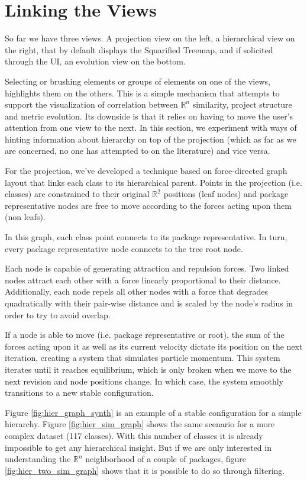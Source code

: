 \section{Linking the Views} \label{sec:linking}
So far we have three views. A projection view on the left, a hierarchical view on the right, that by default displays the Squarified Treemap, and if solicited through the UI, an evolution view on the bottom.

Selecting or brushing elements or groups of elements on one of the views, highlights them on the others. This is a simple mechanism that attempts to support the visualization of correlation between $\mathbb{R}^{n}$ similarity, project structure and metric evolution. Its downside is that it relies on having to move the user's attention from one view to the next. In this section, we experiment with ways of hinting information about hierarchy on top of the projection (which as far as we are concerned, no one has attempted to on the literature) and vice versa.

For the projection, we've developed a technique based on force-directed graph layout that links each class to its hierarchical parent. Points in the projection (i.e. classes) are constrained to their original $\mathbb{R}^{2}$ positions (leaf nodes) and package representative nodes are free to move according to the forces acting upon them (non leafs).

In this graph, each class point connects to its package representative. In turn, every package representative node connects to the tree root node.

Each node is capable of generating attraction and repulsion forces. Two linked nodes attract each other with a force linearly proportional to their distance. Additionally, each node repels all other nodes with a force that degrades quadratically with their pair-wise distance and is scaled by the node's radius in order to try to avoid overlap.

If a node is able to move (i.e. package representative or root), the sum of the forces acting upon it as well as its current velocity dictate its position on the next iteration, creating a system that simulates particle momentum. This system iterates until it reaches equilibrium, which is only broken when we move to the next revision and node positions change. In which case, the system smoothly transitions to a new stable configuration.

Figure \ref{fig:hier_graph_synth} is an example of a stable configuration for a simple hierarchy. Figure \ref{fig:hier_sim_graph} shows the same scenario for a more complex dataset (117 classes). With this number of classes it is already impossible to get any hierarchical insight. But if we are only interested in understanding the $\mathbb{R}^{n}$ neighborhood of a couple of packages, figure \ref{fig:hier_two_sim_graph} shows that it is possible to do so through filtering.

